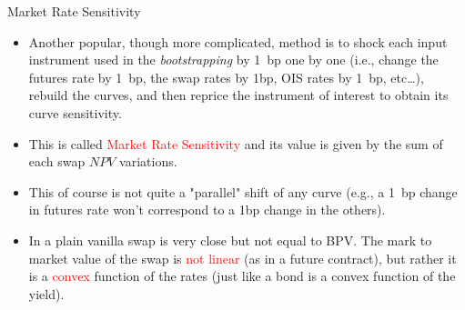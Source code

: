 \documentclass{beamer}
\begin{document}
%
%
%
%
%
%

\begin{frame}{Market Rate Sensitivity}
	\begin{itemize}
		\item<1-> Another popular, though more complicated, method is to shock each input instrument used in the \emph{bootstrapping} by 1~bp one by one (i.e., change the futures rate by 1~bp, the swap rates by 1bp, OIS rates by 1~bp, etc\ldots), rebuild the curves, and then reprice the instrument of interest to obtain its curve sensitivity. 
		\item<2-> This is called \textcolor{red}{Market Rate Sensitivity} and its value is given by the sum of each swap $NPV$ variations.
		\item<3-> This of course is not quite a "parallel" shift of any curve (e.g., a 1~bp change in futures rate won't correspond to a 1bp change in the others).
		\item<4-> In a plain vanilla swap is very close but not equal to BPV. The mark to market value of the swap is \textcolor{red}{not linear} (as in a future contract), but rather it is a \textcolor{red}{convex} function of the rates (just like a bond is a convex function of the yield).
	\end{itemize}
\end{frame}
\end{document}
